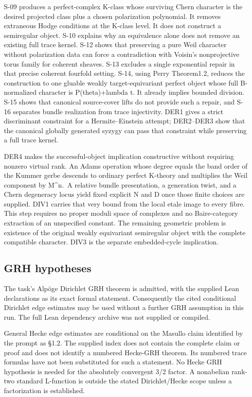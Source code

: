 \documentclass[11pt,a4paper]{article}
\theoremstyle{definition}
\begin{document}
S-09 produces a perfect-complex K-class whose surviving Chern character
is the desired projected class plus a chosen polarization polynomial. It
removes extraneous Hodge conditions at the K-class level. It does not
construct a semiregular object. S-10 explains why an equivalence alone
does not remove an existing full trace kernel. S-12 shows that
preserving a pure Weil character without polarization data can force a
contradiction with Voisin's nonprojective torus family for coherent
sheaves. S-13 excludes a single exponential repair in that precise
coherent fourfold setting. S-14, using Perry Theorem1.2, reduces the
construction to one gluable weakly target-equivariant perfect object
whose full B-normalized character is P(theta)+lambda t. It already
implies bounded division. S-15 shows that canonical source-cover lifts
do not provide such a repair, and S-16 separates bundle realization from
trace injectivity. DER1 gives a strict discriminant constraint for a
Hermite--Einstein attempt; DER2--DER3 show that the canonical globally
generated syzygy can pass that constraint while preserving a full trace
kernel.

DER4 makes the successful-object implication constructive without
requiring nonzero virtual rank. An Adams operation whose degree equals
the band order of the Kummer gerbe descends to ordinary perfect K-theory
and multiplies the Weil component by M\^{}n.~A relative bundle
presentation, a generation twist, and a Chern degeneracy locus yield
fixed explicit N and D once those finite choices are supplied. DIV1
carries that very bound from the local etale image to every fibre. This
step requires no proper moduli space of complexes and no Baire-category
extraction of an unspecified constant. The remaining geometric problem
is existence of the original weakly equivariant semiregular object with
the complete compatible character. DIV3 is the separate embedded-cycle
implication.

\subsection{GRH hypotheses}\label{grh-hypotheses}

The task's Alpöge Dirichlet GRH theorem is admitted, with the supplied
Lean declarations as its exact formal statement. Consequently the cited
conditional Dirichlet edge estimates may be used without a further GRH
assumption in this run. The full Lean dependency archive was not
supplied or compiled.

General Hecke edge estimates are conditional on the Masullo claim
identified by the prompt as §1.2. The supplied index does not contain
the complete claim or proof and does not identify a numbered Hecke-GRH
theorem. Its numbered trace formulas have not been substituted for such
a statement. No Hecke GRH hypothesis is needed for the absolutely
convergent 3/2 factor. A nonabelian rank-two standard L-function is
outside the stated Dirichlet/Hecke scope unless a factorization is
established.
\end{document}
